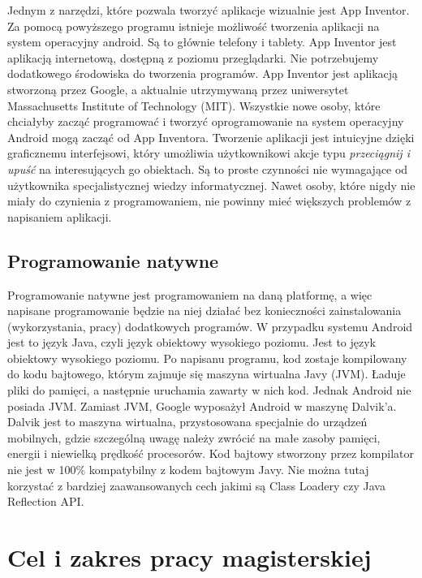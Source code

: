 Jednym z narzędzi, które pozwala tworzyć aplikacje wizualnie jest App Inventor. Za pomocą powyższego programu istnieje możliwość tworzenia aplikacji na system operacyjny android. Są to głównie telefony i tablety. App Inventor jest aplikacją internetową, dostępną z poziomu przeglądarki. Nie potrzebujemy dodatkowego środowiska do tworzenia programów. App Inventor jest aplikacją stworzoną przez Google, a aktualnie utrzymywaną przez uniwersytet Massachusetts Institute of Technology (MIT). Wszystkie nowe osoby, które chciałyby zacząć programować i tworzyć oprogramowanie na system operacyjny Android mogą zacząć od App Inventora. Tworzenie aplikacji jest intuicyjne dzięki graficznemu interfejsowi, który umożliwia użytkownikowi akcje typu \emph{przeciągnij i upuść} na interesujących go obiektach.\cite{wiki:appinventor} Są to proste czynności nie wymagające od użytkownika specjalistycznej wiedzy informatycznej. Nawet osoby, które nigdy nie miały do czynienia z programowaniem, nie powinny mieć większych problemów z napisaniem aplikacji. 

\subsection{Programowanie natywne}
\label{c112}

Programowanie natywne jest programowaniem na daną platformę, a więc napisane programowanie będzie na niej działać bez konieczności zainstalowania (wykorzystania, pracy) dodatkowych programów. W przypadku systemu Android jest to język Java, czyli język obiektowy wysokiego poziomu. Jest to język obiektowy wysokiego poziomu. Po napisanu programu, kod zostaje kompilowany do kodu bajtowego, którym zajmuje się maszyna wirtualna Javy (JVM). Ładuje pliki do pamięci, a następnie uruchamia zawarty w nich kod. Jednak Android nie posiada JVM. Zamiast JVM, Google wyposażył Android w maszynę Dalvik'a. Dalvik jest to maszyna wirtualna, przystosowana specjalnie do urządzeń mobilnych, gdzie szczególną uwagę należy zwrócić na małe zasoby pamięci, energii i niewielką prędkość procesorów. Kod bajtowy stworzony przez kompilator nie jest w 100\% kompatybilny z kodem bajtowym Javy. Nie można tutaj korzystać z bardziej zaawansowanych cech jakimi są Class Loadery czy Java Reflection API. \cite{gphone:dalvik}

\section{Cel i zakres pracy magisterskiej}
\label{c12}

